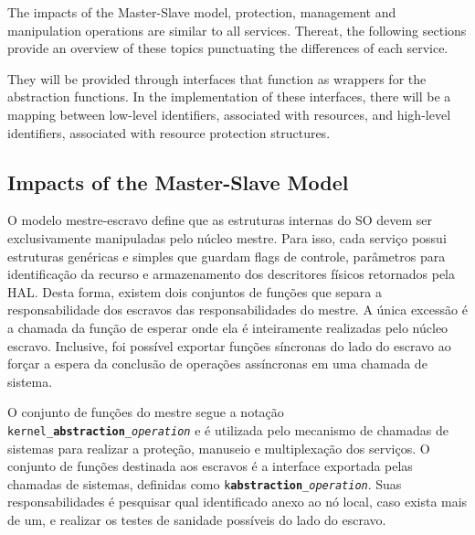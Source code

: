 		The impacts of the Master-Slave model, protection, management and manipulation 
		operations are similar to all services.
		Thereat, the following sections provide an overview of these topics punctuating 
		the differences of each service.

		They will be provided through interfaces that function as wrappers
		for the \hal abstraction functions.
		In the implementation of these interfaces, there will be a mapping
		between low-level identifiers, associated with \hal resources,
		and high-level identifiers, associated with resource protection structures.



		\subsection{Impacts of the Master-Slave Model}

			O modelo mestre-escravo define que as estruturas internas do SO devem ser exclusivamente manipuladas pelo núcleo mestre.
			Para isso, cada serviço possui estruturas genéricas e simples que guardam flags de controle, parâmetros para identificação da recurso e armazenamento dos descritores físicos retornados pela HAL.
			Desta forma, existem dois conjuntos de funções que separa a responsabilidade dos escravos das responsabilidades do mestre.
			A única excessão é a chamada da função de esperar onde ela é inteiramente realizadas pelo núcleo escravo.
			Inclusive, foi possível exportar funções síncronas do lado do escravo ao forçar a espera da conclusão de operações assíncronas em uma chamada de sistema.

			O conjunto de funções do mestre segue a notação \texttt{kernel\_\textbf{abstraction}\_\textit{operation}} e é utilizada pelo mecanismo de chamadas de sistemas para realizar a proteção, manuseio e multiplexação dos serviços.
			O conjunto de funções destinada aos escravos é a interface exportada pelas chamadas de sistemas, definidas como \texttt{k\textbf{abstraction}\_\textit{operation}}.
			Suas responsabilidades é pesquisar qual identificado anexo ao nó local, caso exista mais de um, e realizar os testes de sanidade possíveis do lado do escravo.


